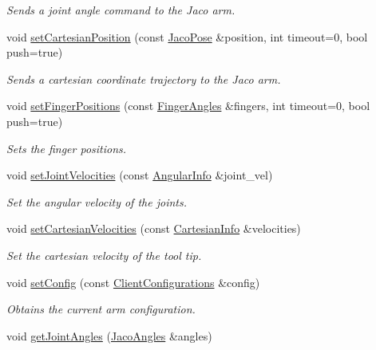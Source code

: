 \begin{DoxyCompactItemize}
\begin{DoxyCompactList}\small\item\em Sends a joint angle command to the Jaco arm. \end{DoxyCompactList}\item 
void \hyperlink{classjaco_1_1_jaco_comm_a7a7375d2609c81f0a03974b06ca07be0}{set\+Cartesian\+Position} (const \hyperlink{classjaco_1_1_jaco_pose}{Jaco\+Pose} \&position, int timeout=0, bool push=true)
\begin{DoxyCompactList}\small\item\em Sends a cartesian coordinate trajectory to the Jaco arm. \end{DoxyCompactList}\item 
void \hyperlink{classjaco_1_1_jaco_comm_a5cdc217373b923f7de2ed468150281fa}{set\+Finger\+Positions} (const \hyperlink{classjaco_1_1_finger_angles}{Finger\+Angles} \&fingers, int timeout=0, bool push=true)
\begin{DoxyCompactList}\small\item\em Sets the finger positions. \end{DoxyCompactList}\item 
void \hyperlink{classjaco_1_1_jaco_comm_af269b1c8d8b1f32c1003ca2e464252f0}{set\+Joint\+Velocities} (const \hyperlink{struct_angular_info}{Angular\+Info} \&joint\+\_\+vel)
\begin{DoxyCompactList}\small\item\em Set the angular velocity of the joints. \end{DoxyCompactList}\item 
void \hyperlink{classjaco_1_1_jaco_comm_a468352480a437cc2144c8d4d289815a5}{set\+Cartesian\+Velocities} (const \hyperlink{struct_cartesian_info}{Cartesian\+Info} \&velocities)
\begin{DoxyCompactList}\small\item\em Set the cartesian velocity of the tool tip. \end{DoxyCompactList}\item 
void \hyperlink{classjaco_1_1_jaco_comm_ae7901b1dff2e84eb89256f46a7c65b62}{set\+Config} (const \hyperlink{struct_client_configurations}{Client\+Configurations} \&config)
\begin{DoxyCompactList}\small\item\em Obtains the current arm configuration. \end{DoxyCompactList}\item 
void \hyperlink{classjaco_1_1_jaco_comm_a5fcb23bf6925a82f2ab5e42460ea3834}{get\+Joint\+Angles} (\hyperlink{classjaco_1_1_jaco_angles}{Jaco\+Angles} \&angles)

\end{DoxyCompactItemize}
